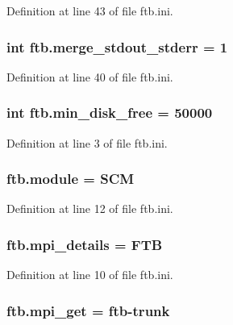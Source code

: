 Definition at line 43 of file ftb.\-ini.

\hypertarget{namespaceftb_afd8660b1540ea079259bfe7501017590}{
\subsubsection[{merge\-\_\-stdout\-\_\-stderr}]{\setlength{\rightskip}{0pt plus 5cm}int ftb.\-merge\-\_\-stdout\-\_\-stderr = 1}}\label{namespaceftb_afd8660b1540ea079259bfe7501017590}


Definition at line 40 of file ftb.\-ini.

\hypertarget{namespaceftb_a6e146aa10e5dfce9215588877f36147e}{
\subsubsection[{min\-\_\-disk\-\_\-free}]{\setlength{\rightskip}{0pt plus 5cm}int ftb.\-min\-\_\-disk\-\_\-free = 50000}}\label{namespaceftb_a6e146aa10e5dfce9215588877f36147e}


Definition at line 3 of file ftb.\-ini.

\hypertarget{namespaceftb_a06ea752188762f1575ad0dd65835373a}{
\subsubsection[{module}]{\setlength{\rightskip}{0pt plus 5cm}ftb.\-module = S\-C\-M}}\label{namespaceftb_a06ea752188762f1575ad0dd65835373a}


Definition at line 12 of file ftb.\-ini.

\hypertarget{namespaceftb_a8c62412466f196971725835c110873a2}{
\subsubsection[{mpi\-\_\-details}]{\setlength{\rightskip}{0pt plus 5cm}ftb.\-mpi\-\_\-details = F\-T\-B}}\label{namespaceftb_a8c62412466f196971725835c110873a2}


Definition at line 10 of file ftb.\-ini.

\hypertarget{namespaceftb_a398d20136ddd939bd203235b0dce9863}{
\subsubsection[{mpi\-\_\-get}]{\setlength{\rightskip}{0pt plus 5cm}ftb.\-mpi\-\_\-get = ftb-\/trunk}}\label{namespaceftb_a398d20136ddd939bd203235b0dce9863}


